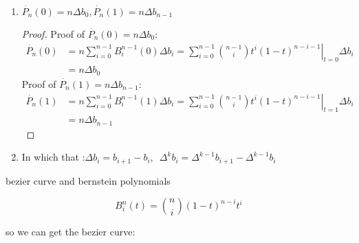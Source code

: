 \begin{remark}
	\begin{enumerate}
		\item $\dot{P_{n}}(0) = n\Delta b_{0},\dot{P_{n}}(1) = n\Delta b_{n-1}$\begin{proof}
			      Proof of $\dot{P_{n}}(0) = n\Delta b_{0}$:
			      \begin{equation*}
				      \begin{aligned}
					      \dot{P_{n}}(0) & = n\sum\limits_{i=0}^{n-1}B_{i}^{n-1}(0)\Delta b_{i} = \left. \sum\limits_{i=0}^{n-1}\binom{n-1}{i}t_{}^{i}(1-t)_{}^{n-i-1} \right|_{t=0}\Delta b_{i} \\
					                     & = n\Delta b_{0}
				      \end{aligned}
			      \end{equation*}
			      Proof of $\dot{P_{n}}(1) = n\Delta b_{n-1}$:
			      \begin{equation*}
				      \begin{aligned}
					      \dot{P_{n}}(1) & = n\sum\limits_{i=0}^{n-1}B_{i}^{n-1}(1)\Delta b_{i} = \left. \sum\limits_{i=0}^{n-1}\binom{n-1}{i}t_{}^{i}(1-t)_{}^{n-i-1} \right|_{t=1} \Delta b_i \\
					                     & = n\Delta b_{n-1}
				      \end{aligned}
			      \end{equation*}
		      \end{proof}

		\item In which that :$\Delta b_{i} = b_{i+1}-b_{i}$,\,\, $\Delta^k b_{i} = \Delta^{k-1}b_{i+1}-\Delta^{k-1}b_{i} $
	\end{enumerate}
\end{remark}
%

bezier curve and bernstein polynomials

\begin{definition}
    \begin{equation*}
        B_{i}^{n}(t) = \binom{n}{i}(1-t)^{n-i}t^{i}
      \end{equation*}
      \label{def:bernstein_polynomials}

      so we can get the bezier curve:
\end{definition}


